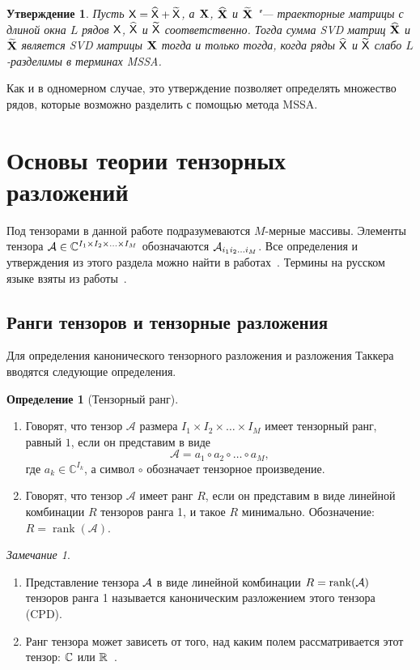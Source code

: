 \documentclass[specialist,
  substylefile=spbu.rtx,
subf,href,colorlinks=true, 12pt]{disser}
\theoremstyle{plain}
\newtheorem{statement}{Утверждение}[section]
\theoremstyle{definition}
\newtheorem{definition}{Определение}[section]
\theoremstyle{remark}
\newtheorem*{remark}{Замечание}
\begin{document}
\begin{statement}
  \label{state:mssa-separability}
  Пусть $\mathsf{X} = \widehat{\mathsf{X}} + \widetilde{\mathsf{X}}$, а $\mathbf{X}$, $\widehat{\mathbf{X}}$ и $\widetilde{\mathbf{X}}$ "--- траекторные
  матрицы с длиной окна $L$ рядов $\mathsf{X}$, $\widehat{\mathsf{X}}$ и $\widetilde{\mathsf{X}}$ соответственно.
  Тогда сумма \emph{SVD} матриц $\widehat{\mathbf{X}}$ и $\widetilde{\mathbf{X}}$ является \emph{SVD} матрицы $\mathbf{X}$ тогда и только тогда, когда
  ряды $\widehat{\mathsf{X}}$ и $\widetilde{\mathsf{X}}$ слабо $L$-разделимы в терминах MSSA.
\end{statement}
Как и в одномерном случае, это утверждение позволяет определять множество рядов, которые возможно разделить с
помощью метода MSSA.


\section{Основы теории тензорных разложений}\label{sec:tensor-decompositions}
Под тензорами в данной работе подразумеваются $M$-мерные массивы.
Элементы тензора $\mathcal{A} \in \mathbb{C}^{I_1 \times I_2 \times \ldots \times I_M}$ обозначаются
$\mathcal{A}_{i_1 i_2 \ldots i_M}$.
Все определения и утверждения из этого раздела можно найти в
работах~\cite{hosvd, tensor-bg, tensor-bg2, tensor-bg3}.
Термины на русском языке взяты из работы~\cite{tensor-rus}.


\subsection{Ранги тензоров и тензорные разложения}\label{subsec:tensor-ranks}
Для определения канонического тензорного разложения и разложения Таккера вводятся следующие определения.
\newpage
\begin{definition}[Тензорный ранг]
  \leavevmode
  \begin{enumerate}
    \item Говорят, что тензор $\mathcal{A}$ размера $I_1\times I_2\times \ldots \times I_M$ имеет тензорный ранг, равный $1$, если он представим в виде
      \[
        \mathcal{A}=a_1\circ a_2\circ \ldots \circ a_M,
      \]
      где $a_{k} \in \mathbb{C}^{I_k}$, а символ $\circ$ обозначает тензорное произведение.
    \item Говорят, что тензор $\mathcal{A}$ имеет ранг $R$, если он представим в виде линейной комбинации $R$ тензоров
      ранга 1, и такое $R$ минимально.
      Обозначение: $R=\operatorname{rank}(\mathcal{A})$.
  \end{enumerate}
\end{definition}
\begin{remark}
  \begin{enumerate}
    \item Представление тензора $\mathcal{A}$ в виде линейной комбинации $R = \operatorname{rank}(\mathcal{A})$ тензоров ранга 1 называется каноническим разложением этого тензора (CPD).
    \item Ранг тензора может зависеть от того, над каким полем рассматривается этот тензор:
      $\mathbb{C}$ или $\mathbb{R}$~\cite{tensor-bg}.
  \end{enumerate}
\end{remark}
\end{document}
